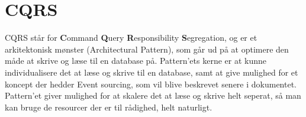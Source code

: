 \chapter{CQRS}

CQRS står for \textbf{C}ommand \textbf{Q}uery \textbf{R}esponsibility \textbf{S}egregation, og er et arkitektonisk mønster (Architectural Pattern), som går ud på at optimere den måde at skrive og læse til en database på. Pattern'ets kerne er at kunne individualisere det at læse og skrive til en database, samt at give mulighed for et koncept der hedder Event sourcing, som vil blive beskrevet senere i dokumentet. Pattern'et giver mulighed for at skalere det at læse og skrive helt seperat, så man kan bruge de resourcer der er til rådighed, helt naturligt.
